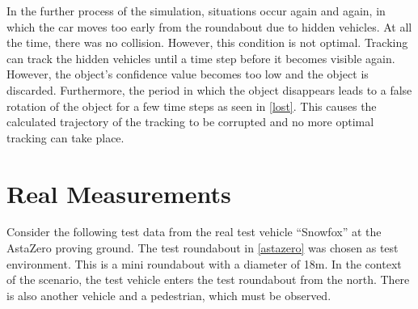 \documentclass[11pt,oneside,openright]{mpreport}
\begin{document}
In the further process of the simulation, situations occur again and again, in which the car moves too early from the roundabout due to hidden vehicles.
At all the time, there was no collision. However, this condition is not optimal. Tracking can track the hidden vehicles until a time step before it becomes visible again.
However, the object's confidence value becomes too low and the object is discarded. 
Furthermore, the period in which the object disappears leads to a false rotation of the object for a few time steps as seen in \cref{lost}. 
This causes the calculated trajectory of the tracking to be corrupted and no more optimal tracking can take place.

\section{Real Measurements}


Consider the following test data from the real test vehicle ``Snowfox'' at the AstaZero proving ground. The test roundabout in \cref{astazero} was chosen 
as test environment. This is a mini roundabout with a diameter of 18m. 
In the context of the scenario, the test vehicle enters the test roundabout from the north. 
There is also another vehicle and a pedestrian, which must be observed.
\end{document}
